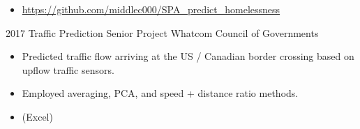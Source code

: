 \documentclass[11pt]{developercv} %
\newcommand{\vsp}{\vspace{-10pt}}
\begin{document}
\begin{entrylist}
{\begin{itemize}
			\item \url{https://github.com/middlec000/SPA_predict_homelessness}
		\end{itemize}}
	\entry
		{2017}
		{Traffic Prediction Senior Project}
		{Whatcom Council of Governments}
		{\vspace{-0.5cm}\begin{itemize}
			\item Predicted traffic flow arriving at the US / Canadian border crossing based on upflow traffic sensors.
			\item Employed averaging, PCA, and speed + distance ratio methods.
			\item (Excel)
		\end{itemize}}
\end{entrylist}
\vsp

\pagebreak
\end{document}
